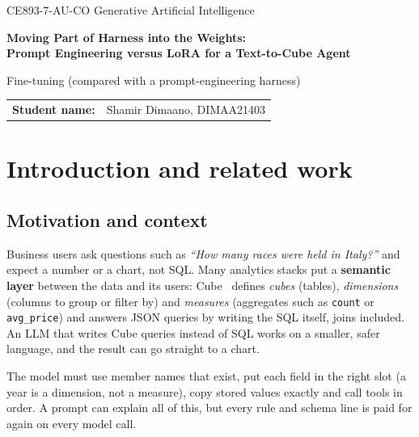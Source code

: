 \begin{center}
\vspace*{1.6cm}
{\small CE893-7-AU-CO \textbar{} Generative Artificial Intelligence}\par
\vspace{1.1cm}
{\Huge\bfseries\color{essexpurple}Moving Part of Harness into the Weights:\\[0.2em] Prompt Engineering versus LoRA for a Text-to-Cube Agent}\par
\vspace{0.5cm}
{\Large Fine-tuning (compared with a prompt-engineering harness)}\par
\vspace{1.4cm}
\begin{tabular}{rl}
\textbf{Student name:} & Shamir Dimaano, DIMAA21403
\end{tabular}
\vfill
\end{center}
\clearpage

\section{Introduction and related work}

\subsection{Motivation and context}
Business users ask questions such as \emph{``How many races were held in Italy?''} and expect a number or a chart, not SQL. Many analytics stacks put a \textbf{semantic layer} between the data and its users: Cube~\cite{cube} defines \emph{cubes} (tables), \emph{dimensions} (columns to group or filter by) and \emph{measures} (aggregates such as \texttt{count} or \texttt{avg\_price}) and answers JSON queries by writing the SQL itself, joins included. An LLM that writes Cube queries instead of SQL works on a smaller, safer language, and the result can go straight to a chart.

The model must use member names that exist, put each field in the right slot (a year is a dimension, not a measure), copy stored values exactly and call tools in order. A prompt can explain all of this, but every rule and schema line is paid for again on every model call.

